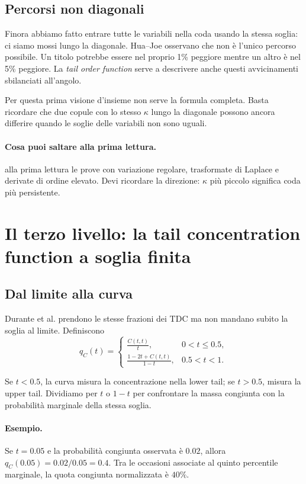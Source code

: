 \documentclass[11pt,a4paper]{article}
\newcommand{\Esempio}{\paragraph{Esempio.}}
\newcommand{\Salta}{\paragraph{Cosa puoi saltare alla prima lettura.}}
\begin{document}
\subsection{Percorsi non diagonali}

Finora abbiamo fatto entrare tutte le variabili nella coda usando la stessa
soglia: ci siamo mossi lungo la diagonale. Hua--Joe osservano che non è
l'unico percorso possibile. Un titolo potrebbe essere nel proprio 1\% peggiore
mentre un altro è nel 5\% peggiore. La \emph{tail order function} serve a
descrivere anche questi avvicinamenti sbilanciati all'angolo.

Per questa prima visione d'insieme non serve la formula completa. Basta
ricordare che due copule con lo stesso $\kappa$ lungo la diagonale possono
ancora differire quando le soglie delle variabili non sono uguali.

\Salta alla prima lettura le prove con variazione regolare, trasformate di
Laplace e derivate di ordine elevato. Devi ricordare la direzione: $\kappa$ più
piccolo significa coda più persistente.

\section{Il terzo livello: la tail concentration function a soglia finita}

\subsection{Dal limite alla curva}

Durante et al. prendono le stesse frazioni dei TDC ma non mandano subito la
soglia al limite. Definiscono
\begin{equation}
 q_C(t)=
 \begin{cases}
  \displaystyle\frac{C(t,t)}{t}, & 0<t\leq0.5,\\[1.1ex]
  \displaystyle\frac{1-2t+C(t,t)}{1-t}, & 0.5<t<1.
 \end{cases}
 \label{eq:tcf}
\end{equation}

Se $t<0.5$, la curva misura la concentrazione nella lower tail; se $t>0.5$,
misura la upper tail. Dividiamo per $t$ o $1-t$ per confrontare la massa
congiunta con la probabilità marginale della stessa soglia.

\Esempio Se $t=0.05$ e la probabilità congiunta osservata è $0.02$, allora
$q_C(0.05)=0.02/0.05=0.4$. Tra le occasioni associate al quinto percentile
marginale, la quota congiunta normalizzata è $40\%$.
\end{document}
